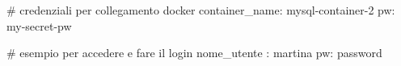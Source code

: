 # credenziali per collegamento docker
container_name: mysql-container-2
pw: my-secret-pw


# esempio per accedere e fare il login 
nome_utente : martina
pw: password
